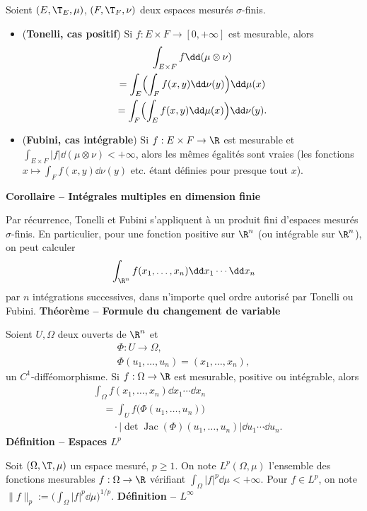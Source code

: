 Soient $(E,\T_E,\mu)$, $(F,\T_F,\nu)$ deux espaces mesurés $\sigma$-finis.
\begin{itemize}
\item (\textbf{Tonelli, cas positif}) Si $f:E\times F\to[0,+\infty]$ est mesurable, alors
\[
\begin{gathered}
\int_{E\times F} f\dd(\mu\otimes\nu)\\
=\int_E\Bigl(\int_F f(x,y)\dd\nu(y)\Bigr)\dd\mu(x)\\
=\int_F\Bigl(\int_E f(x,y)\dd\mu(x)\Bigr)\dd\nu(y).
\end{gathered}
\]
\item (\textbf{Fubini, cas intégrable}) Si $f:E\times F\to\R$ est mesurable et $\int_{E\times F}|f|\dd(\mu\otimes\nu)<+\infty$, alors les mêmes égalités sont vraies (les fonctions $x\mapsto\int_F f(x,y)\dd\nu(y)$ etc. étant définies pour presque tout $x$).
\end{itemize}
\textbf{Corollaire – Intégrales multiples en dimension finie}

Par récurrence, Tonelli et Fubini s’appliquent à un produit fini d’espaces mesurés $\sigma$-finis. En particulier, pour une fonction positive sur $\R^n$ (ou intégrable sur $\R^n$), on peut calculer
\[\int_{\R^n}f(x_1,\ldots,x_n)\dd x_1\cdots\dd x_n\]
par $n$ intégrations successives, dans n’importe quel ordre autorisé par Tonelli ou Fubini.
\textbf{Théorème – Formule du changement de variable}

Soient $U,\Omega$ deux ouverts de $\R^n$ et
\[
\begin{gathered}
\Phi:U\to\Omega,\\
\Phi(u_1,\ldots,u_n)=(x_1,\ldots,x_n),
\end{gathered}
\]
un $C^1$-difféomorphisme. Si $f:\Omega\to\R$ est mesurable, positive ou intégrable, alors
\[
\begin{aligned}
&\int_\Omega f(x_1,\ldots,x_n)\dd x_1\cdots\dd x_n\\
&\quad=\int_U f\bigl(\Phi(u_1,\ldots,u_n)\bigr)\\
&\qquad\cdot\bigl|\det\operatorname{Jac}(\Phi)(u_1,\ldots,u_n)\bigr|\dd u_1\cdots\dd u_n.
\end{aligned}
\]
\textbf{Définition – Espaces $L^p$}

Soit $(\Omega,\T,\mu)$ un espace mesuré, $p\ge1$. On note $L^p(\Omega,\mu)$ l’ensemble des fonctions mesurables $f:\Omega\to\R$ vérifiant $\int_\Omega|f|^p\dd\mu<+\infty$. Pour $f\in L^p$, on note $\|f\|_p:=\bigl(\int_\Omega|f|^p\dd\mu\bigr)^{1/p}$.
\textbf{Définition – $L^\infty$}

